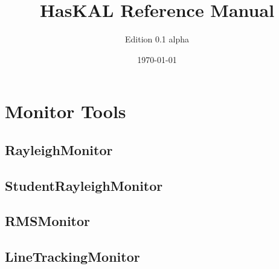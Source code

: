 \documentclass[10pt, a4paper, onecolumn, oneside]{article}
\title{HasKAL Reference Manual}
\author{Edition 0.1 alpha}
\date{\today}
\begin{document}
\maketitle
\tableofcontents %
\newpage

\section{Monitor Tools}

\subsection{RayleighMonitor}

\newpage

\subsection{StudentRayleighMonitor}

\newpage

\subsection{RMSMonitor}

\newpage

\subsection{LineTrackingMonitor}
\newpage

\newpage
\end{document}
